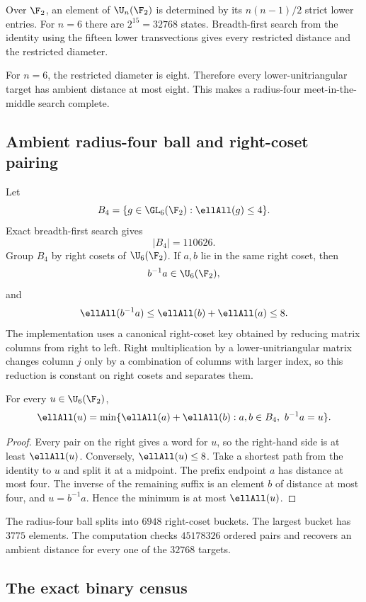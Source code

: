 Over $\F_2$, an element of $\U_n(\F_2)$ is determined by its $n(n-1)/2$ strict lower entries.  For $n=6$ there are $2^{15}=32768$ states.  Breadth-first search from the identity using the fifteen lower transvections gives every restricted distance and the restricted diameter.

For $n=6$, the restricted diameter is eight.  Therefore every lower-unitriangular target has ambient distance at most eight.  This makes a radius-four meet-in-the-middle search complete.

\subsection{Ambient radius-four ball and right-coset pairing}

Let
\[
B_4=\{g\in\GL_6(\F_2):\ellAll(g)\le4\}.
\]
Exact breadth-first search gives
\[
|B_4|=110626.
\]
Group $B_4$ by right cosets of $\U_6(\F_2)$.  If $a,b$ lie in the same right coset, then
\[
b^{-1}a\in\U_6(\F_2),
\]
and
\[
\ellAll(b^{-1}a)\le\ellAll(b)+\ellAll(a)\le8.
\]
The implementation uses a canonical right-coset key obtained by reducing matrix columns from right to left.  Right multiplication by a lower-unitriangular matrix changes column $j$ only by a combination of columns with larger index, so this reduction is constant on right cosets and separates them.

\begin{lemma}\label{lem:mitm-complete}
For every $u\in\U_6(\F_2)$,
\[
\ellAll(u)
=
\min\{\ellAll(a)+\ellAll(b):a,b\in B_4,\ b^{-1}a=u\}.
\]
\end{lemma}

\begin{proof}
Every pair on the right gives a word for $u$, so the right-hand side is at least $\ellAll(u)$.  Conversely, $\ellAll(u)\le8$.  Take a shortest path from the identity to $u$ and split it at a midpoint.  The prefix endpoint $a$ has distance at most four.  The inverse of the remaining suffix is an element $b$ of distance at most four, and $u=b^{-1}a$.  Hence the minimum is at most $\ellAll(u)$.
\end{proof}

The radius-four ball splits into $6948$ right-coset buckets.  The largest bucket has $3775$ elements.  The computation checks $45178326$ ordered pairs and recovers an ambient distance for every one of the $32768$ targets.

\subsection{The exact binary census}


